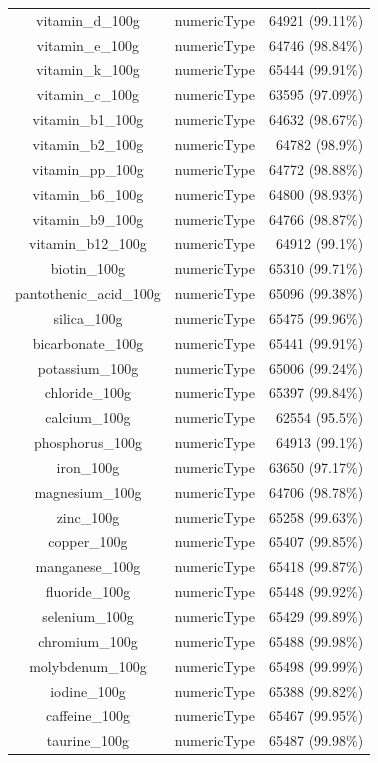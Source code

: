 \documentclass[11pt]{article}
\begin{document}
\begin{center}
\begin{longtable}{|c|c|r|}
vitamin\_d\_100g& numericType& 64921 (99.11\%)\\
vitamin\_e\_100g& numericType& 64746 (98.84\%)\\
vitamin\_k\_100g& numericType& 65444 (99.91\%)\\
vitamin\_c\_100g& numericType& 63595 (97.09\%)\\
vitamin\_b1\_100g& numericType& 64632 (98.67\%)\\
vitamin\_b2\_100g& numericType& 64782 (98.9\%)\\
vitamin\_pp\_100g& numericType& 64772 (98.88\%)\\
vitamin\_b6\_100g& numericType& 64800 (98.93\%)\\
vitamin\_b9\_100g& numericType& 64766 (98.87\%)\\
vitamin\_b12\_100g& numericType& 64912 (99.1\%)\\
biotin\_100g& numericType& 65310 (99.71\%)\\
pantothenic\_acid\_100g& numericType& 65096 (99.38\%)\\
silica\_100g& numericType& 65475 (99.96\%)\\
bicarbonate\_100g& numericType& 65441 (99.91\%)\\
potassium\_100g& numericType& 65006 (99.24\%)\\
chloride\_100g& numericType& 65397 (99.84\%)\\
calcium\_100g& numericType& 62554 (95.5\%)\\
phosphorus\_100g& numericType& 64913 (99.1\%)\\
iron\_100g& numericType& 63650 (97.17\%)\\
magnesium\_100g& numericType& 64706 (98.78\%)\\
zinc\_100g& numericType& 65258 (99.63\%)\\
copper\_100g& numericType& 65407 (99.85\%)\\
manganese\_100g& numericType& 65418 (99.87\%)\\
fluoride\_100g& numericType& 65448 (99.92\%)\\
selenium\_100g& numericType& 65429 (99.89\%)\\
chromium\_100g& numericType& 65488 (99.98\%)\\
molybdenum\_100g& numericType& 65498 (99.99\%)\\
iodine\_100g& numericType& 65388 (99.82\%)\\
caffeine\_100g& numericType& 65467 (99.95\%)\\
taurine\_100g& numericType& 65487 (99.98\%)\\

\end{longtable}
\end{center}
\end{document}
